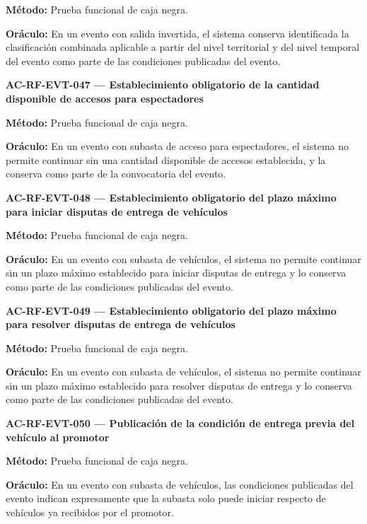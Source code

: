 \documentclass[10pt,letterpaper]{article}
\begin{document}
\textbf{Método:} Prueba funcional de caja negra.\par
\textbf{Oráculo:} En un evento con salida invertida, el sistema conserva identificada la clasificación combinada aplicable a partir del nivel territorial y del nivel temporal del evento como parte de las condiciones publicadas del evento.\par\vspace{0.45em}
\noindent\textbf{AC-RF-EVT-047 --- Establecimiento obligatorio de la cantidad disponible de accesos para espectadores}\par
\textbf{Método:} Prueba funcional de caja negra.\par
\textbf{Oráculo:} En un evento con subasta de acceso para espectadores, el sistema no permite continuar sin una cantidad disponible de accesos establecida, y la conserva como parte de la convocatoria del evento.\par\vspace{0.45em}
\noindent\textbf{AC-RF-EVT-048 --- Establecimiento obligatorio del plazo máximo para iniciar disputas de entrega de vehículos}\par
\textbf{Método:} Prueba funcional de caja negra.\par
\textbf{Oráculo:} En un evento con subasta de vehículos, el sistema no permite continuar sin un plazo máximo establecido para iniciar disputas de entrega y lo conserva como parte de las condiciones publicadas del evento.\par\vspace{0.45em}
\noindent\textbf{AC-RF-EVT-049 --- Establecimiento obligatorio del plazo máximo para resolver disputas de entrega de vehículos}\par
\textbf{Método:} Prueba funcional de caja negra.\par
\textbf{Oráculo:} En un evento con subasta de vehículos, el sistema no permite continuar sin un plazo máximo establecido para resolver disputas de entrega y lo conserva como parte de las condiciones publicadas del evento.\par\vspace{0.45em}
\noindent\textbf{AC-RF-EVT-050 --- Publicación de la condición de entrega previa del vehículo al promotor}\par
\textbf{Método:} Prueba funcional de caja negra.\par
\textbf{Oráculo:} En un evento con subasta de vehículos, las condiciones publicadas del evento indican expresamente que la subasta solo puede iniciar respecto de vehículos ya recibidos por el promotor.\par\vspace{0.45em}
\end{document}
